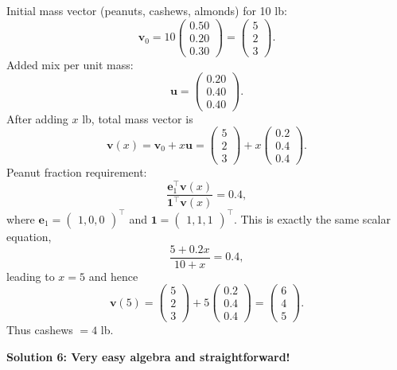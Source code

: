 \begin{enumerate}
 Initial mass vector (peanuts, cashews, almonds) for 10 lb:
 \[\mathbf{v}_0 = 10 \begin{pmatrix} 0.50 \\ 0.20 \\ 0.30 \end{pmatrix} = \begin{pmatrix} 5 \\ 2 \\ 3 \end{pmatrix}.\]Added mix per unit mass:
 \[\mathbf{u} = \begin{pmatrix} 0.20 \\ 0.40 \\ 0.40 \end{pmatrix}.\]After adding \( x \) lb, total mass vector is
 \[\mathbf{v}(x) = \mathbf{v}_0 + x \mathbf{u} = \begin{pmatrix} 5 \\ 2 \\ 3 \end{pmatrix} + x \begin{pmatrix} 0.2 \\ 0.4 \\ 0.4 \end{pmatrix}.\]Peanut fraction requirement:
 \[\frac{\mathbf{e}_1^\top \mathbf{v}(x)}{\mathbf{1}^\top \mathbf{v}(x)} = 0.4,\]where \( \mathbf{e}_1 = \begin{pmatrix} 1, 0, 0 \end{pmatrix}^\top \) and \( \mathbf{1} = \begin{pmatrix} 1, 1, 1 \end{pmatrix}^\top \). This is exactly the same scalar equation,
 \[\frac{5 + 0.2x}{10 + x} = 0.4,\]leading to \( x = 5 \) and hence
 \[\mathbf{v}(5) = \begin{pmatrix} 5 \\ 2 \\ 3 \end{pmatrix} + 5 \begin{pmatrix} 0.2 \\ 0.4 \\ 0.4 \end{pmatrix} = \begin{pmatrix} 6 \\ 4 \\ 5 \end{pmatrix}.\]Thus cashews \( = 4 \) lb.

 



\textbf{Solution 6: Very easy algebra and straightforward!}


\end{enumerate}
